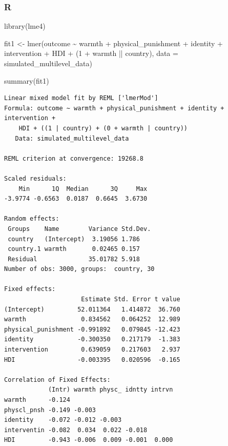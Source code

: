 \documentclass[
  letterpaper,
  DIV=11,
  numbers=noendperiod]{scrreprt}
\newenvironment{Shaded}{\begin{snugshade}}{\end{snugshade}}
\newcommand{\AttributeTok}[1]{\textcolor[rgb]{0.40,0.45,0.13}{#1}}
\newcommand{\DecValTok}[1]{\textcolor[rgb]{0.68,0.00,0.00}{#1}}
\newcommand{\FunctionTok}[1]{\textcolor[rgb]{0.28,0.35,0.67}{#1}}
\newcommand{\NormalTok}[1]{\textcolor[rgb]{0.00,0.23,0.31}{#1}}
\newcommand{\OtherTok}[1]{\textcolor[rgb]{0.00,0.23,0.31}{#1}}
\newcommand{\SpecialCharTok}[1]{\textcolor[rgb]{0.37,0.37,0.37}{#1}}
\begin{document}
\subsubsection{R}

\begin{Shaded}
\begin{Highlighting}[]
\FunctionTok{library}\NormalTok{(lme4)}

\NormalTok{fit1 }\OtherTok{\textless{}{-}} \FunctionTok{lmer}\NormalTok{(outcome }\SpecialCharTok{\textasciitilde{}}\NormalTok{ warmth }\SpecialCharTok{+}\NormalTok{ physical\_punishment }\SpecialCharTok{+} 
\NormalTok{               identity  }\SpecialCharTok{+}\NormalTok{ intervention }\SpecialCharTok{+}\NormalTok{ HDI }\SpecialCharTok{+} 
\NormalTok{               (}\DecValTok{1} \SpecialCharTok{+}\NormalTok{ warmth }\SpecialCharTok{||}\NormalTok{ country),}
             \AttributeTok{data =}\NormalTok{ simulated\_multilevel\_data)}

\FunctionTok{summary}\NormalTok{(fit1)}
\end{Highlighting}
\end{Shaded}

\begin{verbatim}
Linear mixed model fit by REML ['lmerMod']
Formula: outcome ~ warmth + physical_punishment + identity + intervention +  
    HDI + ((1 | country) + (0 + warmth | country))
   Data: simulated_multilevel_data

REML criterion at convergence: 19268.8

Scaled residuals: 
    Min      1Q  Median      3Q     Max 
-3.9774 -0.6563  0.0187  0.6645  3.6730 

Random effects:
 Groups    Name        Variance Std.Dev.
 country   (Intercept)  3.19056 1.786   
 country.1 warmth       0.02465 0.157   
 Residual              35.01782 5.918   
Number of obs: 3000, groups:  country, 30

Fixed effects:
                     Estimate Std. Error t value
(Intercept)         52.011364   1.414872  36.760
warmth               0.834562   0.064252  12.989
physical_punishment -0.991892   0.079845 -12.423
identity            -0.300350   0.217179  -1.383
intervention         0.639059   0.217603   2.937
HDI                 -0.003395   0.020596  -0.165

Correlation of Fixed Effects:
            (Intr) warmth physc_ idntty intrvn
warmth      -0.124                            
physcl_pnsh -0.149 -0.003                     
identity    -0.072 -0.012 -0.003              
interventin -0.082  0.034  0.022 -0.018       
HDI         -0.943 -0.006  0.009 -0.001  0.000
\end{verbatim}
\end{document}
